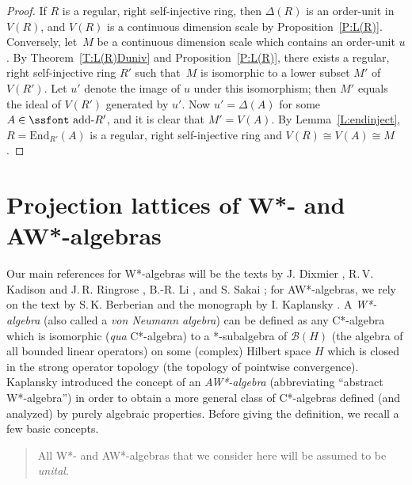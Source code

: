 \documentclass[psamsfonts,reqno]{memo-l}
\theoremstyle{plain}
\theoremstyle{definition}
\theoremstyle{remark}
\numberwithin{equation}{section}
\newcommand{\addR}{\mbox{\ssfont add-}R}
\newcommand{\End}{\mathrm{End}}
\newcommand{\calB}{\mathcal{B}}
\begin{document}
\begin{proof}
If $R$ is a regular, right self-injective ring,
%
then
$\Delta(R)$ is an order-unit in $V(R)$, and $V(R)$ is a
continuous dimension scale by Proposition~\ref{P:L(R)}.
Conversely, let~$M$ be a continuous dimension scale which
contains an order-unit $u$. By Theorem~\ref{T:L(R)Duniv} and
Proposition~\ref{P:L(R)}, there exists a regular, right self-injective ring
$R'$ such that~$M$ is isomorphic to a lower subset $M'$
of $V(R')$. Let $u'$ denote the image of
$u$ under this isomorphism; then $M'$ equals the ideal
of $V(R')$ generated by $u'$. Now $u'= \Delta(A)$ for
some
$A\in\addR'$, and it is clear that $M'=V(A)$. By
Lemma~\ref{L:endinject},
$R= \End_{R'}(A)$ is a regular, right self-injective ring
%
and $V(R)\cong V(A)\cong M$.
\end{proof}

\section{Projection lattices of W*- and AW*-algebras}\label{S:ProjAW*}

Our main references for W*-algebras will be the texts by
J. Dixmier \cite{Dixbook}, R.\,V. Kadison and J.\,R.
Ringrose %
\cite{KadRing},  B.-R. Li \cite{BingRen}, and S. Sakai
\cite{Sakai}; for AW*-al\-ge\-bras, we rely on the text by S.\,K. Berberian \cite{Berb} and the monograph by I. Kaplansky
\cite{Kapl68}. A
\emph{W*-algebra} (also called a
\emph{von Neumann algebra}) can be defined as any C*-algebra which is
isomorphic (\emph{qua} C*-algebra) to a *-subalgebra of $\calB(H)$ (the
algebra of all bounded linear operators) on some (complex) Hilbert space $H$
which is closed in the strong operator topology (the topology of pointwise
convergence). Kaplansky introduced the concept of an
\emph{AW*-algebra} (abbreviating ``abstract W*-algebra'')
in order to obtain a more general class of C*-algebras defined (and
analyzed) by purely algebraic properties. Before giving the definition, we
recall a few basic concepts.
\medskip
\begin{quote}
All W*- and AW*-algebras that we consider here will be
assumed to be \emph{unital}.
\end{quote}
\medskip
\end{document}

